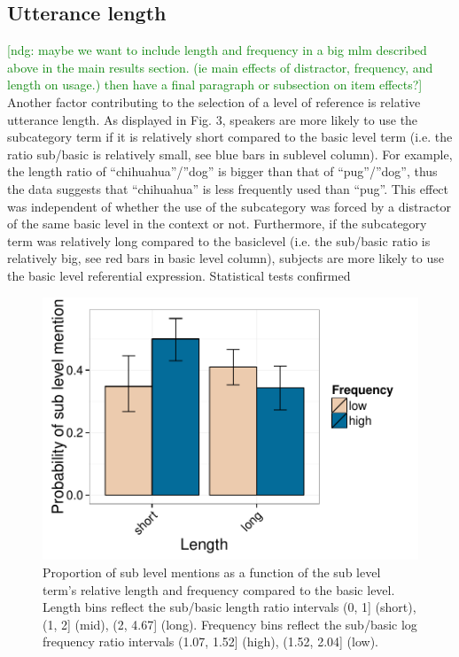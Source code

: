 \documentclass[10pt,letterpaper]{article}
\newcommand{\ndg}[1]{\textcolor{Green}{[ndg: #1]}}
\begin{document}
\subsection{\bf Utterance length}
\ndg{maybe we want to include length and frequency in a big mlm described above in the main results section. (ie main effects of distractor, frequency, and length on usage.) then have a final paragraph or subsection on item effects?}
Another factor contributing to the selection of a level of reference is relative utterance length. As displayed in Fig. 3, speakers are more likely to use the subcategory term if it is relatively short compared to the basic level term (i.e. the ratio sub/basic is relatively small, see blue bars in sublevel column). For example, the length ratio of ``chihuahua''/''dog'' is bigger than that of ``pug''/''dog'', thus the data suggests that ``chihuahua'' is less frequently used than ``pug''. This effect was independent of whether the use of the subcategory was forced by a distractor of the same basic level in the context or not. Furthermore, if the subcategory term was relatively long compared to the basiclevel (i.e. the sub/basic ratio is relatively big, see red bars in basic level column), subjects are more likely to use the basic level referential expression. Statistical tests confirmed

\begin{figure}[ht!]
\centering
\includegraphics[width=.5\textwidth]{graphs/freq-length-interaction}
\caption{Proportion of sub level mentions  as a function of the sub level term's relative length and frequency compared to the basic level. Length bins reflect the sub/basic length ratio intervals (0, 1] (short), (1, 2] (mid), (2, 4.67] (long). Frequency bins reflect the sub/basic log frequency ratio intervals (1.07, 1.52] (high), (1.52, 2.04] (low).}
\label{fig:lengthfreqinteraction}
\end{figure}


\end{document}
